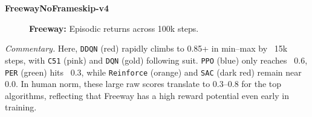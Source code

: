 \noindent
\textbf{FreewayNoFrameskip-v4}
\begin{figure} 
	\centering
	\quad
	\caption{\textbf{Freeway:} Episodic returns across 100k steps.}
	\label{fig:freeway_comparison_combined}
\end{figure}

\noindent
\emph{Commentary.}
Here, \texttt{DDQN} (red) rapidly climbs to 0.85+ in min--max by ~15k steps, 
with \texttt{C51} (pink) and \texttt{DQN} (gold) following suit. 
\texttt{PPO} (blue) only reaches ~0.6, 
\texttt{PER} (green) hits ~0.3, while \texttt{Reinforce} (orange) and \texttt{SAC} (dark red) 
remain near 0.0. 
In human norm, these large raw scores translate to 0.3--0.8 for the top algorithms, 
reflecting that Freeway has a high reward potential even early in training.

\bigskip

